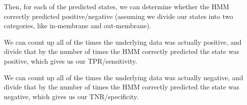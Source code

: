 \begin{enumerate}[label=(\alph*)]
\begin{enumerate}[label=(\roman*)]
        Then, for each of the predicted states, we can determine whether the HMM correctly predicted positive/negative (assuming we divide our states into two categories, like in-membrane and out-membrane).

        We can count up all of the times the underlying data was actually positive, and divide that by the number of times the HMM correctly predicted the state was positive, which gives us our TPR/sensitivity. 

        We can count up all of the times the underlying data was actually negative, and divide that by the number of times the HMM correctly predicted the state was negative, which gives us our TNR/specificity.
        
    \end{enumerate}
        
\end{enumerate}

